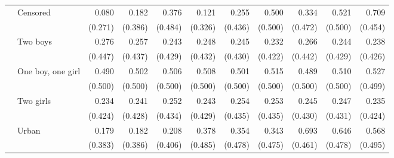 \documentclass[12pt,letterpaper]{article}
\begin{document}
\begin{table}
\begin{center}
\begin{scriptsize}
\begin{threeparttable}
\begin{tabular} {@{} c l D{.}{.}{1.3} D{.}{.}{1.3} D{.}{.}{1.3} D{.}{.}{1.3} D{.}{.}{1.3} D{.}{.}{1.3} D{.}{.}{1.3} D{.}{.}{1.3} D{.}{.}{1.3} @{}}
                    & Censored            &       0.080         &       0.182         &       0.376         &       0.121         &       0.255         &       0.500         &       0.334         &       0.521         &       0.709         \\
                    &                     &     (0.271)         &     (0.386)         &     (0.484)         &     (0.326)         &     (0.436)         &     (0.500)         &     (0.472)         &     (0.500)         &     (0.454)         \\
                    & Two boys            &       0.276         &       0.257         &       0.243         &       0.248         &       0.245         &       0.232         &       0.266         &       0.244         &       0.238         \\
                    &                     &     (0.447)         &     (0.437)         &     (0.429)         &     (0.432)         &     (0.430)         &     (0.422)         &     (0.442)         &     (0.429)         &     (0.426)         \\
                    & One boy, one girl   &       0.490         &       0.502         &       0.506         &       0.508         &       0.501         &       0.515         &       0.489         &       0.510         &       0.527         \\
                    &                     &     (0.500)         &     (0.500)         &     (0.500)         &     (0.500)         &     (0.500)         &     (0.500)         &     (0.500)         &     (0.500)         &     (0.499)         \\
                    & Two girls           &       0.234         &       0.241         &       0.252         &       0.243         &       0.254         &       0.253         &       0.245         &       0.247         &       0.235         \\
                    &                     &     (0.424)         &     (0.428)         &     (0.434)         &     (0.429)         &     (0.435)         &     (0.435)         &     (0.430)         &     (0.431)         &     (0.424)         \\
                    & Urban               &       0.179         &       0.182         &       0.208         &       0.378         &       0.354         &       0.343         &       0.693         &       0.646         &       0.568         \\
                    &                     &     (0.383)         &     (0.386)         &     (0.406)         &     (0.485)         &     (0.478)         &     (0.475)         &     (0.461)         &     (0.478)         &     (0.495)         \\

\end{tabular}
\end{threeparttable}
\end{scriptsize}
\end{center}
\end{table}
\end{document}
